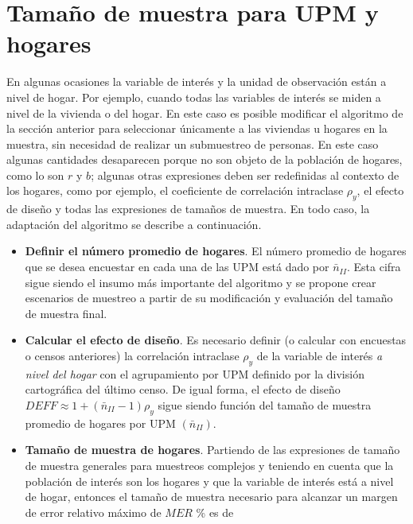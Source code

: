 \documentclass[
  12pt,
  spanish,
]{book}
\begin{document}
\hypertarget{tamauxf1o-de-muestra-para-upm-y-hogares}{%
\section{Tamaño de muestra para UPM y hogares}\label{tamauxf1o-de-muestra-para-upm-y-hogares}}

En algunas ocasiones la variable de interés y la unidad de observación están a nivel de hogar. Por ejemplo, cuando todas las variables de interés se miden a nivel de la vivienda o del hogar. En este caso es posible modificar el algoritmo de la sección anterior para seleccionar únicamente a las viviendas u hogares en la muestra, sin necesidad de realizar un submuestreo de personas. En este caso algunas cantidades desaparecen porque no son objeto de la población de hogares, como lo son \(r\) y \(b\); algunas otras expresiones deben ser redefinidas al contexto de los hogares, como por ejemplo, el coeficiente de correlación intraclase \(\rho_y\), el efecto de diseño y todas las expresiones de tamaños de muestra. En todo caso, la adaptación del algoritmo se describe a continuación.

\begin{itemize}
\item
  \textbf{Definir el número promedio de hogares}. El número promedio de hogares que se desea encuestar en cada una de las UPM está dado por \(\bar{n}_{II}\). Esta cifra sigue siendo el insumo más importante del algoritmo y se propone crear escenarios de muestreo a partir de su modificación y evaluación del tamaño de muestra final.
\item
  \textbf{Calcular el efecto de diseño}. Es necesario definir (o calcular con encuestas o censos anteriores) la correlación intraclase \(\rho_y\) de la variable de interés \emph{a nivel del hogar} con el agrupamiento por UPM definido por la división cartográfica del último censo. De igual forma, el efecto de diseño \(DEFF \approx 1 + (\bar{n}_{II} - 1)\rho_y\) sigue siendo función del tamaño de muestra promedio de hogares por UPM \((\bar{n}_{II})\).
\item
  \textbf{Tamaño de muestra de hogares}. Partiendo de las expresiones de tamaño de muestra generales para muestreos complejos y teniendo en cuenta que la población de interés son los hogares y que la variable de interés está a nivel de hogar, entonces el tamaño de muestra necesario para alcanzar un margen de error relativo máximo de \(MER\) \% es de
\end{itemize}
\end{document}
